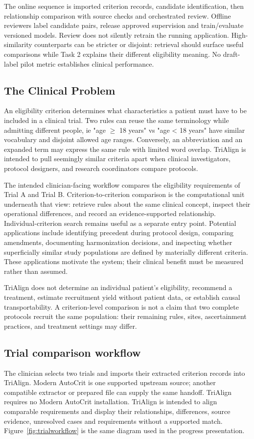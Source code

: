 \documentclass[10pt,letterpaper]{article}
\begin{document}
The online sequence is imported criterion records, candidate identification,
then relationship comparison with source checks and orchestrated review.
Offline reviewers label candidate pairs, release approved supervision and
train/evaluate versioned models. Review does not silently retrain the running
application. High-similarity counterparts can be stricter or disjoint:
retrieval should surface useful comparisons while Task 2 explains their
different eligibility meaning. No draft-label pilot metric establishes
clinical performance.

\subsection{The Clinical Problem}
An eligibility criterion determines what characteristics a patient must have to be included in a clinical trial.
Two rules can reuse the same terminology while admitting different people, ie "age $\ge$ 18 years" vs "age < 18 years" have similar vocabulary and disjoint allowed age ranges. Conversely,
an abbreviation and an expanded term may express the same rule with limited word overlap. TriAlign is intended to pull seemingly similar criteria apart when
clinical investigators, protocol designers, and research coordinators compare
protocols.

The intended clinician-facing workflow compares the eligibility requirements
of Trial A and Trial B. Criterion-to-criterion comparison is the computational
unit underneath that view: retrieve rules about the same clinical concept,
inspect their operational differences, and record an evidence-supported
relationship. Individual-criterion search remains useful as a separate entry
point. Potential applications include identifying precedent during
protocol design, comparing amendments, documenting harmonization decisions,
and inspecting whether superficially similar study populations are defined
by materially different criteria. These applications motivate the system;
their clinical benefit must be measured rather than assumed.

TriAlign does not determine an individual patient's eligibility, recommend a
treatment, estimate recruitment yield without patient data, or establish
causal transportability. A criterion-level comparison is not a claim that
two complete protocols recruit the same population: their remaining rules,
sites, ascertainment practices, and treatment settings may differ.

\subsection{Trial comparison workflow}
\label{sec:trialworkflow}
The clinician selects two trials and imports their extracted criterion
records into TriAlign. Modern AutoCrit is one supported upstream source;
another compatible extractor or prepared file can supply the same handoff.
TriAlign requires no Modern AutoCrit installation. TriAlign is intended to
align comparable requirements and display their relationships, differences,
source evidence, unresolved cases and requirements without a supported
match. Figure~\ref{fig:trialworkflow} is the same diagram used in the progress
presentation.
\end{document}
